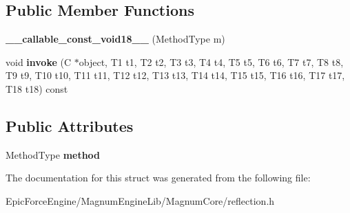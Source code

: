 \subsection*{Public Member Functions}
\begin{DoxyCompactItemize}
\item 
{\bfseries \+\_\+\+\_\+callable\+\_\+const\+\_\+void18\+\_\+\+\_\+} (Method\+Type m)\hypertarget{structagm_1_1reflection_1_1____callable__const__void18_____a9a9fc18ceb896add374ac6e3c1944415}{}\label{structagm_1_1reflection_1_1____callable__const__void18_____a9a9fc18ceb896add374ac6e3c1944415}

\item 
void {\bfseries invoke} (C $\ast$object, T1 t1, T2 t2, T3 t3, T4 t4, T5 t5, T6 t6, T7 t7, T8 t8, T9 t9, T10 t10, T11 t11, T12 t12, T13 t13, T14 t14, T15 t15, T16 t16, T17 t17, T18 t18) const \hypertarget{structagm_1_1reflection_1_1____callable__const__void18_____ad6598b0f4f5d7569fd5e3e83fdc13c24}{}\label{structagm_1_1reflection_1_1____callable__const__void18_____ad6598b0f4f5d7569fd5e3e83fdc13c24}

\end{DoxyCompactItemize}
\subsection*{Public Attributes}
\begin{DoxyCompactItemize}
\item 
Method\+Type {\bfseries method}\hypertarget{structagm_1_1reflection_1_1____callable__const__void18_____a6226682d2f258415918d21a288e024b5}{}\label{structagm_1_1reflection_1_1____callable__const__void18_____a6226682d2f258415918d21a288e024b5}

\end{DoxyCompactItemize}


The documentation for this struct was generated from the following file\+:\begin{DoxyCompactItemize}
\item 
Epic\+Force\+Engine/\+Magnum\+Engine\+Lib/\+Magnum\+Core/reflection.\+h\end{DoxyCompactItemize}
